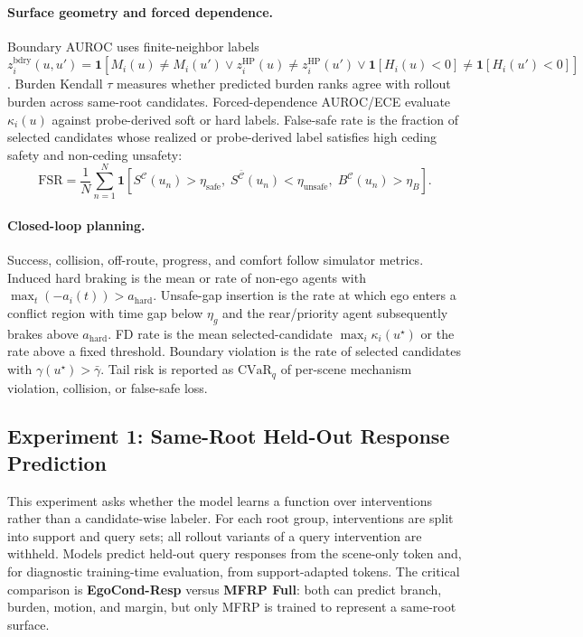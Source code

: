 \documentclass[10pt]{article}
\newcommand{\framework}{MFRP}
\newcommand{\ind}{\mathbf{1}}
\newcommand{\cC}{\mathcal{C}}
\begin{document}
\paragraph{Surface geometry and forced dependence.}
Boundary AUROC uses finite-neighbor labels \(z_i^{\mathrm{bdry}}(u,u')=\ind[M_i(u)\neq M_i(u') \lor z_i^{\mathrm{HP}}(u)\neq z_i^{\mathrm{HP}}(u') \lor \ind[H_i(u)<0]\neq \ind[H_i(u')<0]]\). Burden Kendall \(\tau\) measures whether predicted burden ranks agree with rollout burden across same-root candidates. Forced-dependence AUROC/ECE evaluate \(\kappa_i(u)\) against probe-derived soft or hard labels. False-safe rate is the fraction of selected candidates whose realized or probe-derived label satisfies high ceding safety and non-ceding unsafety:
\[
\mathrm{FSR}
=
\frac{1}{N}
\sum_{n=1}^{N}
\ind\!\left[
S^{\cC}(u_n)>\eta_{\mathrm{safe}},
\;
S^{\bar{\cC}}(u_n)<\eta_{\mathrm{unsafe}},
\;
B^{\cC}(u_n)>\eta_B
\right].
\]

\paragraph{Closed-loop planning.}
Success, collision, off-route, progress, and comfort follow simulator metrics. Induced hard braking is the mean or rate of non-ego agents with \(\max_t(-a_i(t))>a_{\mathrm{hard}}\). Unsafe-gap insertion is the rate at which ego enters a conflict region with time gap below \(\eta_g\) and the rear/priority agent subsequently brakes above \(a_{\mathrm{hard}}\). FD rate is the mean selected-candidate \(\max_i\kappa_i(u^\star)\) or the rate above a fixed threshold. Boundary violation is the rate of selected candidates with \(\gamma(u^\star)>\bar\gamma\). Tail risk is reported as \(\mathrm{CVaR}_{q}\) of per-scene mechanism violation, collision, or false-safe loss.

\subsection{Experiment 1: Same-Root Held-Out Response Prediction}
\label{sec:exp_heldout_response}

This experiment asks whether the model learns a function over interventions rather than a candidate-wise labeler. For each root group, interventions are split into support and query sets; all rollout variants of a query intervention are withheld. Models predict held-out query responses from the scene-only token and, for diagnostic training-time evaluation, from support-adapted tokens. The critical comparison is \textbf{EgoCond-Resp} versus \textbf{\framework{} Full}: both can predict branch, burden, motion, and margin, but only \framework{} is trained to represent a same-root surface.
\end{document}
